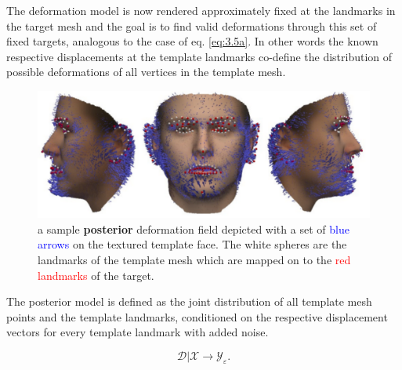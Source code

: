 The deformation model is now rendered approximately fixed at the landmarks in the target mesh and the goal is to find valid deformations through this set of fixed targets, analogous to the case of eq. \ref{eq:3.5a}. In other words the known respective displacements at the template landmarks co-define the distribution of possible deformations of all vertices in the template mesh.
\begin{figure}[h!]
    \includegraphics[width=\textwidth]{./resources/img/posterior_deformations.pdf}
    \caption{a sample \textbf{posterior} deformation field depicted with a set of \textcolor{blue}{blue arrows} on the textured template face. The white spheres are the landmarks of the template mesh which are mapped on to the \textcolor{red}{red landmarks} of the target.}
\label{fig:posteriordeformations}
\end{figure}
The posterior model is defined as the joint distribution of all template mesh points and the
template landmarks, conditioned on the respective displacement vectors for every template landmark with added noise. 
\begin{center}
\begin{equation}
    \mathcal{D}\vert \mathcal{X} \rightarrow \mathcal{Y}_{\varepsilon}. 
\end{equation}
\end{center}
